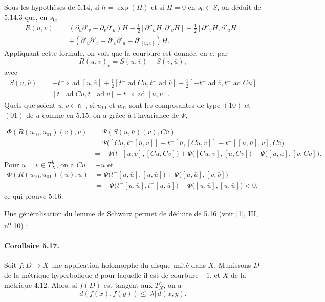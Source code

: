 \documentclass[10pt]{article}
\theoremstyle{deligne}
\newcommand{\ad}{\operatorname{ad}}
\begin{document}
Sous les hypothèses de 5.14, si $h=\exp(H)$ et si $H=0$ en $s_0\in S$, on déduit de 5.14.3 que, en $s_0$,
\[
\begin{aligned}
R(u,v)
={}&(\partial_u\partial'_v-\partial_v\partial'_u)H
-\tfrac12[\partial''_uH,\partial'_vH]
+\tfrac12[\partial''_vH,\partial'_uH]\\
&+(\partial'_u\partial'_v-\partial'_v\partial'_u-\partial'_{[u,v]})H .
\end{aligned}
\]
Appliquant cette formule, on voit que la courbure est donnée, en $e$, par
\[
  R(u,v)_e=S(u,\overline v)-S(v,\overline u),
\]
avec
\[
\begin{aligned}
S(u,\overline v)
&=-t^-\circ\ad[u,\overline v]
+\tfrac12[t^-\ad Cu,t^-\ad\overline v]
+\tfrac12[-t^-\ad\overline v,t^-\ad Cu]\\
&=[t^-\ad Cu,t^-\ad\overline v]
-t^-\circ\ad[u,\overline v].
\end{aligned}
\]
Quels que soient $u,v\in\mathfrak n^-$, si $u_{10}$ et $u_{01}$ sont les composantes de type $(10)$ et $(01)$ de $u$ comme en 5.15, on a grâce à l'invariance de $\Psi$,


\[
\begin{aligned}
\Phi(R(u_{10},u_{01})(v),v)
&=\Psi(S(u,\overline u)(v),C\overline v)\\
&=\Psi\bigl([Cu,t^-[\overline u,v]]-t^-[\overline u,[Cu,v]]-t^-[[u,\overline u],v],C\overline v\bigr)\\
&=-\Psi\bigl(t^-[\overline u,v],[Cu,C\overline v]\bigr)
  +\Psi\bigl([Cu,v],[\overline u,C\overline v]\bigr)
  -\Psi\bigl([u,\overline u],[v,C\overline v]\bigr).
\end{aligned}
\]
Pour $u=v\in T_X^h$, on a $Cu=-u$ et
\[
\begin{aligned}
\Phi(R(u_{10},u_{01})(u),u)
&=\Psi\bigl(t^-[u,\overline u],[u,\overline u]\bigr)
  +\Psi\bigl([u,\overline u],[v,\overline v]\bigr)\\
&=-\Phi\bigl(t^-[u,\overline u],t^-[u,\overline u]\bigr)
  -\Phi\bigl([u,\overline u],[u,\overline u]\bigr)<0,
\end{aligned}
\]
ce qui prouve 5.16.

Une généralisation du lemme de Schwarz permet de déduire de 5.16 (voir [1], III, n\textsuperscript{o} 10) :

\paragraph{Corollaire 5.17.}
Soit $f:D\to X$ une application holomorphe du disque unité dans $X$. Munissons $D$ de la métrique hyperbolique $d$ pour laquelle il est de courbure $-1$, et $X$ de la métrique 4.12. Alors, si $f(D)$ est tangent aux $T_X^h$, on a
\[
  d(f(x),f(y))\le |\lambda|\,d(x,y).
\]
\end{document}
